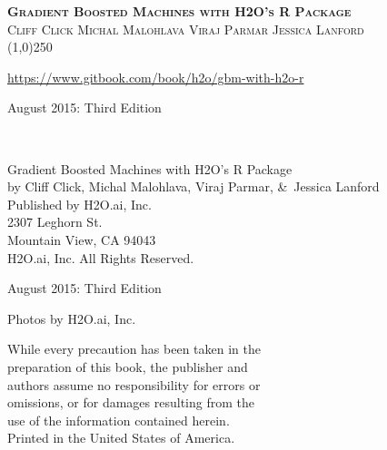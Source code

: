 









\thispagestyle{empty} %

\begin{center}
\textsc{\Large\bf{Gradient Boosted Machines with H2O's R Package}}
\\
\bigskip
\textsc{\small{Cliff Click \hspace{40pt} Michal Malohlava \hspace{40pt} Viraj Parmar \hspace{40pt} Jessica Lanford}}
\\
\bigskip
\line(1,0){250}  %

{\url{https://www.gitbook.com/book/h2o/gbm-with-h2o-r}}

\bigskip
August 2015: Third Edition 
\\%
\bigskip
\end{center}

{\raggedright\vfill\ 

Gradient Boosted Machines with H2O's R Package\\
  by Cliff Click, Michal Malohlava, Viraj Parmar, \&\ Jessica Lanford\\
\bigskip
  Published by H2O.ai, Inc. \\
2307 Leghorn St. \\
Mountain View, CA 94043\\
\bigskip
{} H2O.ai, Inc. All Rights Reserved. 
\bigskip

August 2015: Third Edition
\bigskip

Photos by \textcopyright H2O.ai, Inc. 
\bigskip

While every precaution has been taken in the\\
preparation of this book, the publisher and\\
authors assume no responsibility for errors or\\
omissions, or for damages resulting from the\\
use of the information contained herein.\\
\bigskip
Printed in the United States of America. 


}\par

\newpage
\tableofcontents

